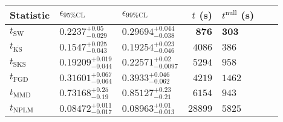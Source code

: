 \begin{tabular}{l|llr|llr}
Statistic & $\epsilon_{95\%\mathrm{CL}}$ & $\epsilon_{99\%\mathrm{CL}}$ & $t$ (s) & $t^{\mathrm{null}}$ (s) \\
	\midrule
	$t_{\mathrm{SW}}$ & $0.2237_{-0.029}^{+0.05}$ & $0.29694_{-0.038}^{+0.044}$ & ${\mathbf{876}}$ & ${\mathbf{303}}$ \\
	$t_{\overline{\mathrm{KS}}}$ & ${\mathbf{0.1547_{-0.043}^{+0.025}}}$ & ${\mathbf{0.19254_{-0.046}^{+0.023}}}$ & $4086$ & $386$ \\
	$t_{\mathrm{SKS}}$ & $0.19209_{-0.044}^{+0.019}$ & $0.22571_{-0.0097}^{+0.02}$ & $5294$ & $958$ \\
	$t_{\mathrm{FGD}}$ & $0.31601_{-0.064}^{+0.067}$ & $0.3933_{-0.062}^{+0.046}$ & $4219$ & $1462$ \\
	$t_{\mathrm{MMD}}$ & $0.73168_{-0.19}^{+0.25}$ & $0.85127_{-0.21}^{+0.23}$ & $6154$ & $943$ \\
\rowcolor{red!35}	$t_{\mathrm{NPLM}}$ & $0.08472_{-0.017}^{+0.011}$ & $0.08963_{-0.013}^{+0.01}$ & $28899$ & $5825$ \\
	\bottomrule
\end{tabular}